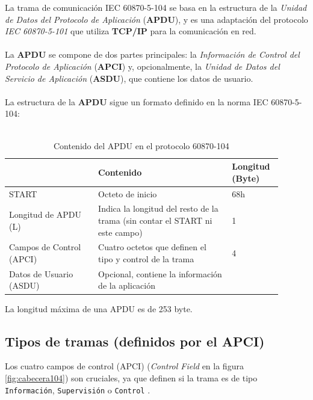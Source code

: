 \documentclass[a5paper]{book}%
\begin{document}
La trama de comunicación IEC 60870-5-104 se basa en la estructura de la \textit{Unidad de Datos del Protocolo de Aplicación} (\textbf{APDU}), y es una adaptación del protocolo \textit{IEC 60870-5-101} que utiliza \textbf{TCP/IP} para la comunicación en red.\\\\

La \textbf{APDU} se compone de dos partes principales: la \textit{Información de Control del Protocolo de Aplicación }(\textbf{APCI}) y, opcionalmente, la \textit{Unidad de Datos del Servicio de Aplicación} (\textbf{ASDU}), que contiene los datos de usuario.\\\\

La estructura de la \textbf{APDU} sigue un formato definido en la norma IEC 60870-5-104:\\\\


\begin{table}[H]
	\centering
	\caption{Contenido del APDU en el protocolo 60870-104}
\begin{tabular}{|p{0.3\linewidth}|p{0.45\linewidth}|p{0.15\linewidth}|}
  \hline
\rowcolor{black} \color{white}{Campo}&\color{white}Contenido& \color{white}Longitud (Byte)\\\hline
START&	Octeto de inicio&68h\\\hline		
Longitud de APDU (L)&Indica la longitud del resto de la trama (sin contar el START ni este campo)&1\\\hline
Campos de Control (APCI)	&Cuatro octetos que definen el tipo y control de la trama&	4\\\hline		
Datos de Usuario (ASDU)&Opcional, contiene la información de la aplicación& \\\hline
  \end{tabular}
\end{table}

  La longitud máxima de una APDU es de 253 byte.

  \subsection{Tipos de tramas (definidos por el APCI)}


  Los cuatro campos de control (APCI) (\textit{Control Field} en la figura \ref{fig:cabecera104})  son cruciales, ya que definen si la trama es de tipo \texttt{Información}, \texttt{Supervisión} o \texttt{Control} \cite{GOMEZ2019}.
  
\end{document}
